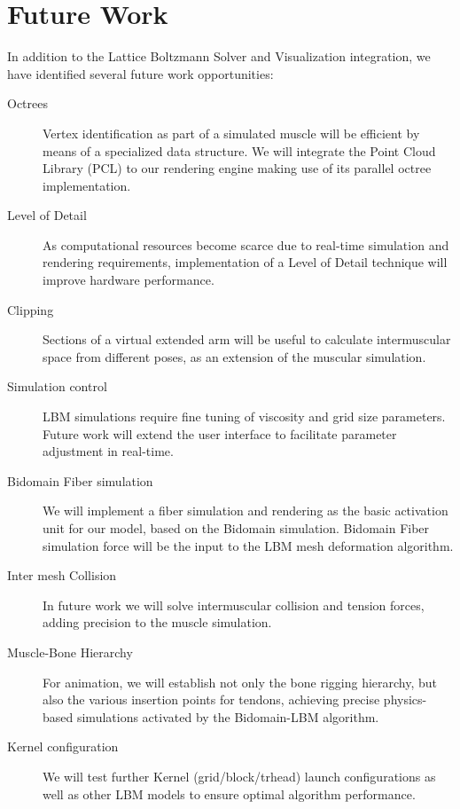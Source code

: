 
\section{Future Work}
\label{sec:futureWork}
In addition to the Lattice Boltzmann Solver and Visualization integration, we have identified several future work opportunities:

\begin{description}
\item[Octrees]
Vertex identification as part of a simulated muscle will be efficient by means of a specialized data structure. We will integrate the Point Cloud Library (PCL) to our rendering engine making use of its parallel octree implementation.
\item[Level of Detail]
As computational resources become scarce due to real-time simulation and rendering requirements, implementation of a Level of Detail technique will improve hardware performance.
\item[Clipping]
Sections of a virtual extended arm will be useful to calculate intermuscular space from different poses, as an extension of the muscular simulation.
\item[Simulation control]
LBM simulations require fine tuning of viscosity and grid size parameters. Future work will extend the user interface to facilitate parameter adjustment in real-time.
\item[Bidomain Fiber simulation]
We will implement a fiber simulation and rendering as the basic activation unit for our model, based on the Bidomain simulation. Bidomain Fiber simulation force will be the input to the LBM mesh deformation algorithm.
\item[Inter mesh Collision]
In future work we will solve intermuscular collision and tension forces, adding precision to the muscle simulation.
\item[Muscle-Bone Hierarchy]
For animation, we will establish not only the bone rigging hierarchy, but also the various insertion points for tendons, achieving precise physics-based simulations activated by the Bidomain-LBM algorithm.
\item[Kernel configuration]
We will test further Kernel (grid/block/trhead) launch configurations as well as other LBM models to ensure optimal algorithm performance. 
\end{description}
